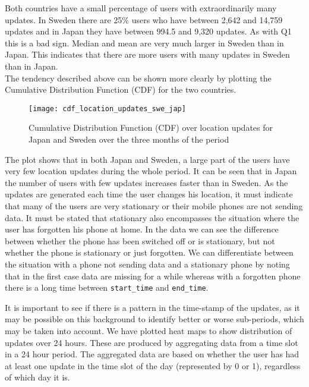 Both countries have a small percentage of users with extraordinarily many updates. In Sweden there are 25\% users who have between 2,642 and 14,759 updates and in Japan they have between 994.5 and 9,320 updates. As with Q1 this is a bad sign.
Median and mean are very much larger in Sweden than in Japan. This indicates that there are more users with many updates in Sweden than in Japan.  \\

The tendency described above can be shown more clearly by plotting the Cumulative Distribution Function (CDF) for the two countries.  
 
\begin{figure}[H]
    \hspace*{-1.0cm}
    \centering
    \texttt{[image: cdf\_location\_updates\_swe\_jap]}
    \caption{Cumulative Distribution Function (CDF) over location updates for Japan and Sweden over the three months of the period}
    \label{fig:country_cdf}
\end{figure}

The plot shows that in both Japan and Sweden, a large part of the users have very few location updates during the whole period. It can be seen that in Japan the number of users with few updates increases faster than in Sweden.  
As the updates are generated each time the user changes his location, it must indicate that many of the users are very stationary or their mobile phones are not sending data. It must be stated that stationary also encompasses the situation where the user has forgotten his phone at home. In the data we can see the difference between whether the phone has been switched off or is stationary, but not whether the phone is stationary or just forgotten. We can differentiate between the situation with a phone not sending data and a stationary phone by noting that in the first case data are missing for a while whereas with a forgotten phone there is a long time between \texttt{start\_time} and \texttt{end\_time}.  

It is important to see if there is a pattern in the time-stamp of the updates, as it may be possible on this background to identify better or worse sub-periods, which may be taken into account. 
We have plotted heat maps to show distribution of  updates over 24 hours. These are produced by aggregating data from a time slot in a 24 hour period. The aggregated data are based on whether the user has had at least one update in the time slot of the day (represented by 0 or 1), regardless of which day it is. 

